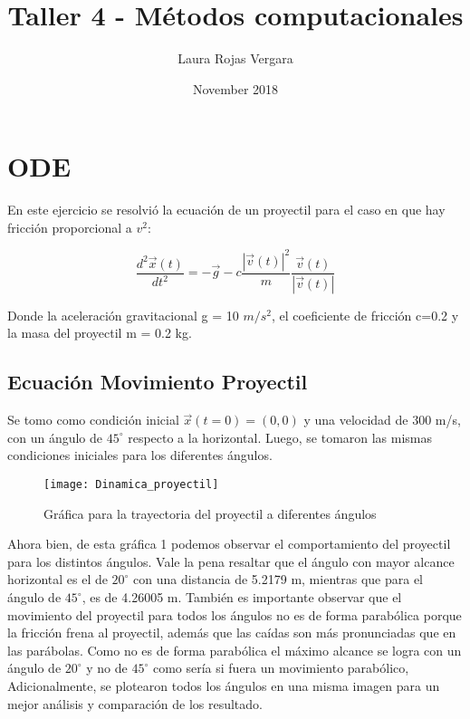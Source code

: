 \documentclass{article}
\title{Taller 4 - Métodos computacionales}
\author{Laura Rojas Vergara}
\date{November 2018}
\begin{document}
\maketitle

\section{ODE}

En este ejercicio se resolvió la ecuación de un proyectil para el caso en que hay fricción proporcional a $v^2$:

\begin{equation}
   \frac{d^2\vec{x}(t)}{dt^2} = -\vec{g}-c \frac{|\vec{v}(t)|^2}{m} \frac{\vec{v}(t)}{|\vec{v}(t)|}
\end{equation}


Donde la aceleración gravitacional g = 10 $m/s^2$, el coeficiente de fricción c=0.2 y la masa del proyectil m = 0.2 kg. 

\subsection{Ecuación Movimiento Proyectil}

Se tomo como condición inicial $\vec{x}(t = 0) = (0,0)$ y una velocidad de 300 m/s, con un ángulo de $45^\circ$ respecto a la horizontal. Luego, se tomaron las mismas condiciones iniciales para los diferentes ángulos.

\begin{figure}[h!]
\centering
\texttt{[image: Dinamica\_proyectil]}
\caption{Gráfica para la trayectoria del proyectil a diferentes ángulos}
\label{proyectil}
\end{figure}


Ahora bien, de esta gráfica 1 podemos observar el comportamiento del proyectil para los distintos ángulos. Vale la pena resaltar que el ángulo con mayor alcance horizontal es el de $20^\circ$ con una distancia de 5.2179 m, mientras que para el ángulo de $45^\circ$, es de 4.26005 m. También es importante observar que el movimiento del proyectil para todos los ángulos no es de forma parabólica porque la fricción frena al proyectil, además que las caídas son más pronunciadas que en las parábolas. Como no es de forma parabólica el máximo alcance se logra con un ángulo de $20^\circ$ y no de $45^\circ$ como sería si fuera un movimiento parabólico, Adicionalmente, se plotearon todos los ángulos en una misma imagen para un mejor análisis y comparación de los resultado. 
\end{document}
